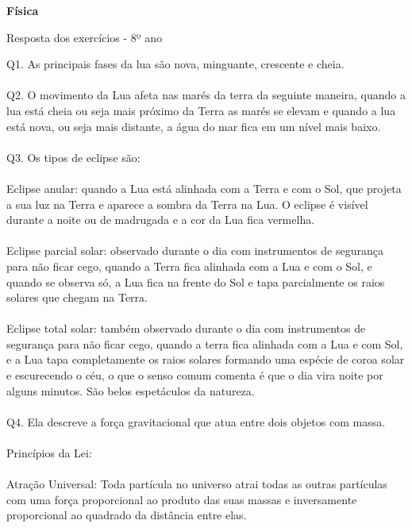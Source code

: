 \documentclass[a4paper,14pt]{article}
\begin{document}
	
	\noindent\textbf{Física} 
	
	\begin{center}Resposta dos exercícios - 8º ano
	\end{center}
	
	\noindent Q1. As principais fases da lua são nova, minguante, crescente e cheia. \\\\
	Q2. O movimento da Lua afeta nas marés da terra da seguinte maneira, quando a lua está cheia ou seja mais próximo da Terra as marés se elevam e quando a lua está nova, ou seja mais distante, a água do mar fica em um nível mais baixo. \\\\
	Q3. Os tipos de eclipse são: \\\\
	Eclipse anular: quando a Lua está alinhada com a Terra e com o Sol, que projeta a sua luz na Terra e aparece a sombra da Terra na Lua. O eclipse é visível durante a noite ou de madrugada e a cor da Lua fica vermelha. \\\\
	Eclipse parcial solar: observado durante o dia com instrumentos de segurança para não ficar cego, quando a Terra fica alinhada com a Lua e com o Sol, e quando se observa só, a Lua fica na frente do Sol e tapa parcialmente os raios solares que chegam na Terra. \\\\
	Eclipse total solar: também observado durante o dia com instrumentos de segurança para não ficar cego, quando a terra fica alinhada com a Lua e com Sol, e a Lua tapa completamente os raios solares formando uma espécie de coroa solar e escurecendo o céu, o que o senso comum comenta é que o dia vira noite por alguns minutos. São belos espetáculos da natureza. \\\\
	Q4. Ela descreve a força gravitacional que atua entre dois objetos com massa. \\\\
	Princípios da Lei: \\\\
	Atração Universal: Toda partícula no universo atrai todas as outras partículas com uma força proporcional ao produto das suas massas e inversamente proporcional ao quadrado da distância entre elas. \\
\end{document}
